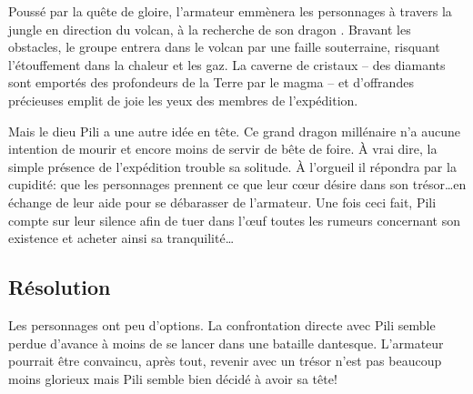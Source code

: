 Poussé par la quête de gloire, l'armateur emmènera les personnages à travers la jungle en direction du volcan, à la recherche de \og son dragon \fg.
Bravant les obstacles, le groupe entrera dans le volcan par une faille souterraine, risquant l'étouffement dans la chaleur et les gaz.
La caverne de cristaux -- des diamants sont emportés des profondeurs de la Terre par le magma -- et d'offrandes précieuses emplit de joie les yeux des membres de l'expédition.

Mais le dieu Pili a une autre idée en tête.
Ce grand dragon millénaire n'a aucune intention de mourir et encore moins de servir de bête de foire.
À vrai dire, la simple présence de l'expédition trouble sa solitude.
À l'orgueil il répondra par la cupidité: que les personnages prennent ce que leur cœur désire dans son trésor\dots en échange de leur aide pour se débarasser de l'armateur.
Une fois ceci fait, Pili compte sur leur silence afin de tuer dans l'œuf toutes les rumeurs concernant son existence et acheter ainsi sa tranquilité\dots

\subsection{Résolution}

Les personnages ont peu d'options.
La confrontation directe avec Pili semble perdue d'avance à moins de se lancer dans une bataille dantesque.
L'armateur pourrait être convaincu, après tout, revenir avec un trésor n'est pas beaucoup moins glorieux mais Pili semble bien décidé à avoir sa tête!

